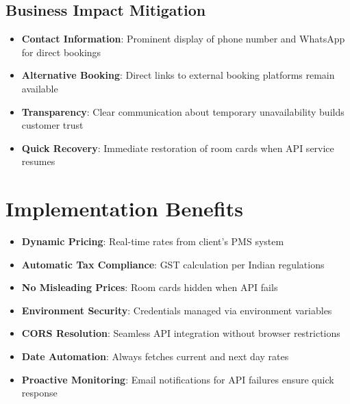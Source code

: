 \documentclass[12pt]{article}
\begin{document}
\subsection{Business Impact Mitigation}
\begin{itemize}
    \item \textbf{Contact Information}: Prominent display of phone number and WhatsApp for direct bookings
    \item \textbf{Alternative Booking}: Direct links to external booking platforms remain available
    \item \textbf{Transparency}: Clear communication about temporary unavailability builds customer trust
    \item \textbf{Quick Recovery}: Immediate restoration of room cards when API service resumes
\end{itemize}

\section{Implementation Benefits}

\begin{itemize}
    \item \textbf{Dynamic Pricing}: Real-time rates from client's PMS system
    \item \textbf{Automatic Tax Compliance}: GST calculation per Indian regulations
    \item \textbf{No Misleading Prices}: Room cards hidden when API fails
    \item \textbf{Environment Security}: Credentials managed via environment variables
    \item \textbf{CORS Resolution}: Seamless API integration without browser restrictions
    \item \textbf{Date Automation}: Always fetches current and next day rates
    \item \textbf{Proactive Monitoring}: Email notifications for API failures ensure quick response
\end{itemize}
\end{document}
